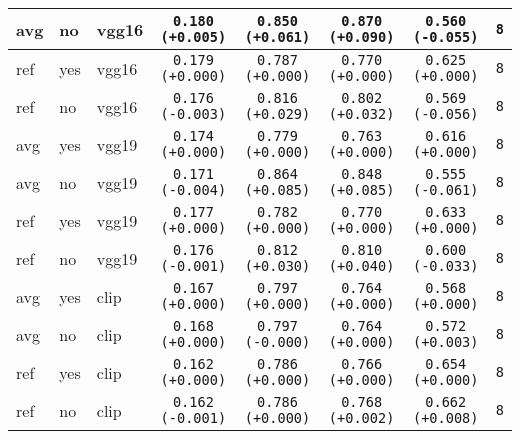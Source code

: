 \begin{tabular}{|l|l|l|c|c|c|c|c|}
avg & no & vgg16 & \texttt{0.180 {\color{green}(+0.005)}} & \texttt{0.850 {\color{red}(+0.061)}} & \texttt{0.870 {\color{red}(+0.090)}} & \texttt{0.560 {\color{red}(-0.055)}} & \texttt{8} \\
\hline
\rowcolor{verylightgray}ref & yes & vgg16 & \texttt{0.179 {\color{black}(+0.000)}} & \texttt{0.787 {\color{black}(+0.000)}} & \texttt{0.770 {\color{black}(+0.000)}} & \texttt{0.625 {\color{black}(+0.000)}} & \texttt{8} \\
ref & no & vgg16 & \texttt{0.176 {\color{red}(-0.003)}} & \texttt{0.816 {\color{red}(+0.029)}} & \texttt{0.802 {\color{red}(+0.032)}} & \texttt{0.569 {\color{red}(-0.056)}} & \texttt{8} \\
\hline
\rowcolor{verylightgray}avg & yes & vgg19 & \texttt{0.174 {\color{black}(+0.000)}} & \texttt{0.779 {\color{black}(+0.000)}} & \texttt{0.763 {\color{black}(+0.000)}} & \texttt{0.616 {\color{black}(+0.000)}} & \texttt{8} \\
avg & no & vgg19 & \texttt{0.171 {\color{red}(-0.004)}} & \texttt{0.864 {\color{red}(+0.085)}} & \texttt{0.848 {\color{red}(+0.085)}} & \texttt{0.555 {\color{red}(-0.061)}} & \texttt{8} \\
\hline
\rowcolor{verylightgray}ref & yes & vgg19 & \texttt{0.177 {\color{black}(+0.000)}} & \texttt{0.782 {\color{black}(+0.000)}} & \texttt{0.770 {\color{black}(+0.000)}} & \texttt{0.633 {\color{black}(+0.000)}} & \texttt{8} \\
ref & no & vgg19 & \texttt{0.176 {\color{red}(-0.001)}} & \texttt{0.812 {\color{red}(+0.030)}} & \texttt{0.810 {\color{red}(+0.040)}} & \texttt{0.600 {\color{red}(-0.033)}} & \texttt{8} \\
\hline
\rowcolor{verylightgray}avg & yes & clip & \texttt{0.167 {\color{black}(+0.000)}} & \texttt{0.797 {\color{black}(+0.000)}} & \texttt{0.764 {\color{black}(+0.000)}} & \texttt{0.568 {\color{black}(+0.000)}} & \texttt{8} \\
avg & no & clip & \texttt{0.168 {\color{black}(+0.000)}} & \texttt{0.797 {\color{black}(-0.000)}} & \texttt{0.764 {\color{black}(+0.000)}} & \texttt{0.572 {\color{green}(+0.003)}} & \texttt{8} \\
\hline
\rowcolor{verylightgray}ref & yes & clip & \texttt{0.162 {\color{black}(+0.000)}} & \texttt{0.786 {\color{black}(+0.000)}} & \texttt{0.766 {\color{black}(+0.000)}} & \texttt{0.654 {\color{black}(+0.000)}} & \texttt{8} \\
ref & no & clip & \texttt{0.162 {\color{red}(-0.001)}} & \texttt{0.786 {\color{black}(+0.000)}} & \texttt{0.768 {\color{red}(+0.002)}} & \texttt{0.662 {\color{green}(+0.008)}} & \texttt{8} \\
\hline
\end{tabular}
